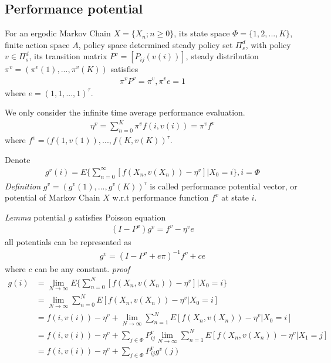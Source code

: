 \documentclass[runningheads]{llncs}
\begin{document}
    \subsection{Performance potential}
    For an ergodic Markov Chain $X = \{ X_n; n \geq 0 \}$, its state space $\Phi = \{ 1, 2,..., K \}$,
    finite action space $A$, policy space determined steady policy set $\Pi_s^d$,
    with policy $v \in \Pi_s^d$, its transition matrix $P^v = [P_{ij}(v(i))]$,
    steady distribution $\pi^v = (\pi^v(1),..., \pi^v(K))$ satisfies
    \begin{align}
        \pi^v P^v = \pi^v, \pi^v e = 1
    \end{align}
    where $e = (1, 1,..., 1)^\tau$.
    \par
    We only consider the infinite time average performance evaluation.
    \begin{align}
        \eta^v = \sum_{n=0}^K \pi^v f(i, v(i)) = \pi^v f^v
    \end{align}
    where $f^v = (f(1, v(1)),...,f(K, v(K))^\tau$.
    \par
    Denote 
    \begin{align}
        g^v(i) = E \{ \sum_{n=0}^\infty [f(X_n, v(X_n)) - \eta^v] | X_0 = i \}, i = \Phi
    \end{align}
    \emph{Definition} $g^v = (g^v(1),..., g^v(K))^\tau$ is called performance potential vector,
    or potential of Markov Chain $X$ w.r.t performance function $f^v$ at state $i$.
    \par\noindent
    \emph{Lemma}
    potential $g$ satisfies Poisson equation
    \begin{align}
        (I - P^v)g^v = f^v - \eta^v e
    \end{align}
    all potentials can be represented as 
    \begin{align}
        g^v = (I - P^v + e \pi)^{-1} f^v + ce
    \end{align}
    where $c$ can be any constant.
    \emph{proof}
    \begin{align}
        g(i) &= \mathop{\lim}_{N \rightarrow \infty} E \{ \sum_{n=0}^N [f(X_n, v(X_n)) - \eta^v] | X_0 = i \} \\
        &= \mathop{\lim}_{N \rightarrow \infty}  \sum_{n=0}^N E [f(X_n, v(X_n)) - \eta^v | X_0 = i ] \\
        &= f(i, v(i)) - \eta^v + \mathop{\lim}_{N \rightarrow \infty} \sum_{n=1}^N E [f(X_n, v(X_n)) - \eta^v | X_0 = i ] \\
        &= f(i, v(i)) - \eta^v + \sum_{j \in \Phi} P^v_{ij} \mathop{\lim}_{N \rightarrow \infty} \sum_{n=1}^N E [f(X_n, v(X_n)) - \eta^v | X_1 = j ] \\
        &= f(i, v(i)) - \eta^v + \sum_{j \in \Phi} P^v_{ij} g^v(j)
    \end{align}
\end{document}
